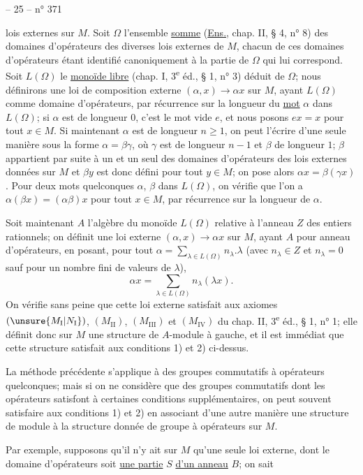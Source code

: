 \begin{center}-- 25 -- \hfill n° 371\end{center}
lois externes sur $M$. Soit $\Omega$ l'ensemble \uline{somme} (\uline{Ens.}, chap. II, § 4, n° 8) des domaines d'opérateurs des diverses lois externes de $M$, chacun de ces domaines d'opérateurs étant identifié canoniquement à la partie de $\Omega$ qui lui correspond. Soit $L(\Omega)$ le \uline{monoïde libre} (chap. I, 3\textsuperscript{e} éd., § 1, n° 3) déduit de $\Omega$; nous définirons une loi de composition externe $(\alpha,x)\to\alpha x$ sur $M$, ayant $L(\Omega)$ comme domaine d'opérateurs, par récurrence sur la longueur du \uline{mot} $\alpha$ dans $L(\Omega)$; si $\alpha$ est de longueur $0$, c'est le mot vide $e$, et nous posons $ex=x$ pour tout $x\in M$. Si maintenant $\alpha$ est de longueur $n\geq1$, on peut l'écrire d'une seule manière sous la forme $\alpha=\beta\gamma$, où $\gamma$ est de longueur $n-1$ et $\beta$ de longueur $1$; $\beta$ appartient par suite à un et un seul des domaines d'opérateurs des lois externes données sur $M$ et $\beta y$ est donc défini pour tout $y\in M$; on pose alors $\alpha x=\beta(\gamma x)$. Pour deux mots quelconques $\alpha$, $\beta$ dans $L(\Omega)$, on vérifie que l'on a $\alpha(\beta x)=(\alpha\beta)x$ pour tout $x\in M$, par récurrence sur la longueur de $\alpha$.

Soit maintenant $A$ l'algèbre du monoïde $L(\Omega)$ relative à l'anneau $Z$ des entiers rationnels; on définit une loi externe $(\alpha,x)\to\alpha x$ sur $M$, ayant $A$ pour anneau d'opérateurs, en posant, pour tout $\alpha=\sum_{\lambda\in L(\Omega)}n_\lambda.\lambda$ (avec $n_\lambda\in Z$ et $n_\lambda=0$ sauf pour un nombre fini de valeurs de $\lambda$),
\[
\alpha x=\sum_{\lambda\in L(\Omega)}n_\lambda(\lambda x).
\]
On vérifie sans peine que cette loi externe satisfait aux axiomes $(\unsure{M_{\mathrm I}|N_{\mathrm I}})$, $(M_{\mathrm{II}})$, $(M_{\mathrm{III}})$ et $(M_{\mathrm{IV}})$ du chap. II, 3\textsuperscript{e} éd., § 1, n° 1; elle définit donc sur $M$ une structure de $A$-module à gauche, et il est immédiat que cette structure satisfait aux conditions 1) et 2) ci-dessus.

La méthode précédente s'applique à des groupes commutatifs à opérateurs quelconques; mais si on ne considère que des groupes commutatifs dont les opérateurs satisfont à certaines conditions supplémentaires, on peut souvent satisfaire aux conditions 1) et 2) en associant d'une autre manière une structure de module à la structure donnée de groupe à opérateurs sur $M$.

Par exemple, supposons qu'il n'y ait sur $M$ qu'une seule loi externe, dont le domaine d'opérateurs soit \uline{une partie} $S$ \uline{d'un anneau} $B$; on sait
